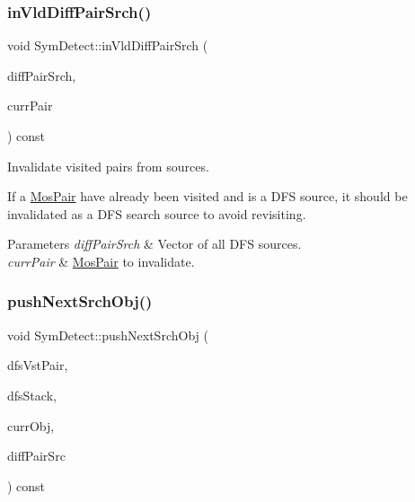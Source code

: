 \subsubsection{\texorpdfstring{in\+Vld\+Diff\+Pair\+Srch()}{inVldDiffPairSrch()}}
{\footnotesize\ttfamily void Sym\+Detect\+::in\+Vld\+Diff\+Pair\+Srch (\begin{DoxyParamCaption}\item[{std\+::vector$<$ \hyperlink{structMosPair}{Mos\+Pair} $>$ \&}]{diff\+Pair\+Srch,  }\item[{\hyperlink{structMosPair}{Mos\+Pair} \&}]{curr\+Pair }\end{DoxyParamCaption}) const\hspace{0.3cm}{\ttfamily [private]}}



Invalidate visited pairs from sources. 

If a \hyperlink{structMosPair}{Mos\+Pair} have already been visited and is a D\+FS source, it should be invalidated as a D\+FS search source to avoid revisiting.


\begin{DoxyParams}{Parameters}
{\em diff\+Pair\+Srch} & Vector of all D\+FS sources. \\
\hline
{\em curr\+Pair} & \hyperlink{structMosPair}{Mos\+Pair} to invalidate. \\
\hline
\end{DoxyParams}
\mbox{\label{classSymDetect_a9bdb845d015762b59f3dc977a76aed32}} 
\subsubsection{\texorpdfstring{push\+Next\+Srch\+Obj()}{pushNextSrchObj()}}
{\footnotesize\ttfamily void Sym\+Detect\+::push\+Next\+Srch\+Obj (\begin{DoxyParamCaption}\item[{std\+::vector$<$ \hyperlink{structMosPair}{Mos\+Pair} $>$ \&}]{dfs\+Vst\+Pair,  }\item[{std\+::vector$<$ \hyperlink{structSymDetect_1_1srchObj}{srch\+Obj} $>$ \&}]{dfs\+Stack,  }\item[{\hyperlink{structSymDetect_1_1srchObj}{srch\+Obj} \&}]{curr\+Obj,  }\item[{std\+::vector$<$ \hyperlink{structMosPair}{Mos\+Pair} $>$ \&}]{diff\+Pair\+Src }\end{DoxyParamCaption}) const\hspace{0.3cm}{\ttfamily [private]}}



